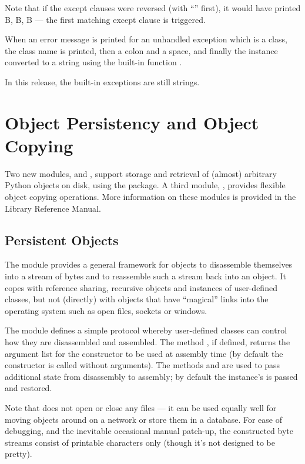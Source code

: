 Note that if the except clauses were reversed (with ``''
first), it would have printed B, B, B --- the first matching except
clause is triggered.

When an error message is printed for an unhandled exception which is a
class, the class name is printed, then a colon and a space, and
finally the instance converted to a string using the built-in function
.

In this release, the built-in exceptions are still strings.


\section{Object Persistency and Object Copying}

Two new modules,  and , support storage and
retrieval of (almost) arbitrary Python objects on disk, using the
 package.  A third module, , provides flexible
object copying operations.  More information on these modules is
provided in the Library Reference Manual.

\subsection{Persistent Objects}

The module  provides a general framework for objects to
disassemble themselves into a stream of bytes and to reassemble such a
stream back into an object.  It copes with reference sharing,
recursive objects and instances of user-defined classes, but not
(directly) with objects that have ``magical'' links into the operating
system such as open files, sockets or windows.

The  module defines a simple protocol whereby
user-defined classes can control how they are disassembled and
assembled.  The method , if defined, returns
the argument list for the constructor to be used at assembly time (by
default the constructor is called without arguments).  The methods
 and  are used to pass
additional state from disassembly to assembly; by default the
instance's  is passed and restored.

Note that  does not open or close any files --- it can be
used equally well for moving objects around on a network or store them
in a database.  For ease of debugging, and the inevitable occasional
manual patch-up, the constructed byte streams consist of printable
\ASCII{} characters only (though it's not designed to be pretty).

